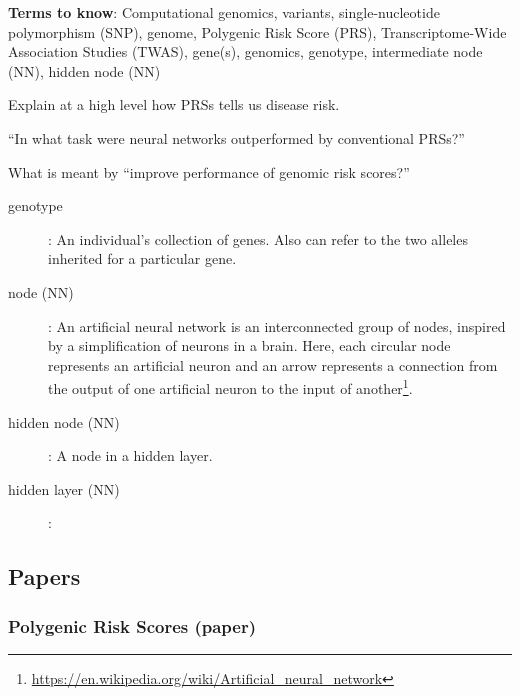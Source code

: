 \textbf{Terms to know}: Computational genomics, variants, single-nucleotide polymorphism (SNP), genome, Polygenic Risk Score (PRS), Transcriptome-Wide Association Studies (TWAS), gene(s), genomics, genotype, intermediate node (NN), hidden node (NN)

\begin{quest}
\item
	Explain at a high level how PRSs tells us disease risk.
\item
	``In what task were neural networks outperformed by conventional PRSs?''
\item
	What is meant by ``improve performance of genomic risk scores?''
\end{quest}

\begin{description}
\item[genotype]:
	An individual's collection of genes. Also can refer to the two alleles inherited for a particular gene.

\item[node (NN)]:
	An artificial neural network is an interconnected group of nodes, inspired by a simplification of neurons in a brain. Here, each circular node represents an artificial neuron and an arrow represents a connection from the output of one artificial neuron to the input of another\footnote{\url{https://en.wikipedia.org/wiki/Artificial_neural_network}}.
\item[hidden node (NN)] : A node in a hidden layer.

\item[hidden layer (NN)]:

\end{description}
\subsection{Papers}
\subsubsection*{Polygenic Risk Scores (paper) \cite{wray2010multi}}
